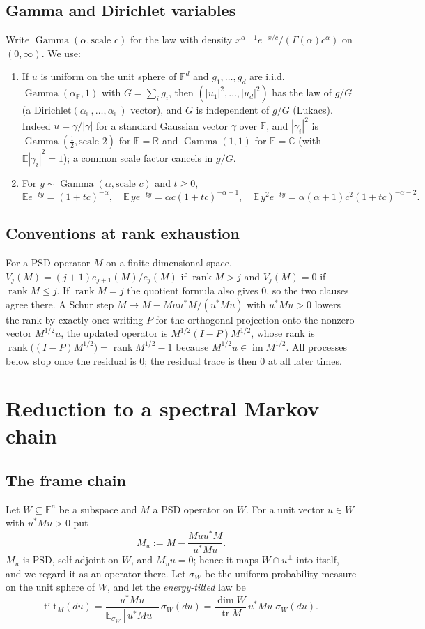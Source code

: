 \documentclass[11pt,a4paper]{article}
\theoremstyle{definition}
\newcommand{\E}{\mathbb{E}}
\newcommand{\R}{\mathbb{R}}
\newcommand{\C}{\mathbb{C}}
\newcommand{\F}{\mathbb{F}}
\newcommand{\tr}{\operatorname{tr}}
\newcommand{\rank}{\operatorname{rank}}
\newcommand{\Gam}{\operatorname{Gamma}}
\newcommand{\tilt}{\mathrm{tilt}}
\begin{document}
\subsection{Gamma and Dirichlet variables}
Write $\Gam(\alpha,\text{scale }c)$ for the law with density $x^{\alpha-1}e^{-x/c}/(\Gamma(\alpha)c^\alpha)$ on $(0,\infty)$. We use:
\begin{enumerate}
\item[(G1)] If $u$ is uniform on the unit sphere of $\F^d$ and $g_1,\dots,g_d$ are i.i.d.\ $\Gam(\alpha_\F,1)$ with $G=\sum_ig_i$, then $(|u_1|^2,\dots,|u_d|^2)$ has the law of $g/G$ (a $\mathrm{Dirichlet}(\alpha_\F,\dots,\alpha_\F)$ vector), and $G$ is independent of $g/G$ (Lukacs). Indeed $u=\gamma/|\gamma|$ for a standard Gaussian vector $\gamma$ over $\F$, and $|\gamma_i|^2$ is $\Gam(\frac12,\text{scale }2)$ for $\F=\R$ and $\Gam(1,1)$ for $\F=\C$ (with $\E|\gamma_i|^2=1$); a common scale factor cancels in $g/G$.
\item[(G2)] For $y\sim\Gam(\alpha,\text{scale }c)$ and $t\ge0$,
\[
\E e^{-ty}=(1+tc)^{-\alpha},\quad \E\,ye^{-ty}=\alpha c(1+tc)^{-\alpha-1},\quad \E\,y^2e^{-ty}=\alpha(\alpha+1)c^2(1+tc)^{-\alpha-2}.
\]
\end{enumerate}

\subsection{Conventions at rank exhaustion}\label{sec:conventions}
For a PSD operator $M$ on a finite-dimensional space, $V_j(M)=(j+1)e_{j+1}(M)/e_j(M)$ if $\rank M>j$ and $V_j(M)=0$ if $\rank M\le j$. If $\rank M=j$ the quotient formula also gives $0$, so the two clauses agree there. A Schur step $M\mapsto M-Muu^*M/(u^*Mu)$ with $u^*Mu>0$ lowers the rank by exactly one: writing $P$ for the orthogonal projection onto the nonzero vector $M^{1/2}u$, the updated operator is $M^{1/2}(I-P)M^{1/2}$, whose rank is $\rank\big((I-P)M^{1/2}\big)=\rank M^{1/2}-1$ because $M^{1/2}u\in\operatorname{im}M^{1/2}$. All processes below stop once the residual is $0$; the residual trace is then $0$ at all later times.
\section{Reduction to a spectral Markov chain}\label{sec:reduction}

\subsection{The frame chain}
Let $W\subseteq\F^n$ be a subspace and $M$ a PSD operator on $W$. For a unit vector $u\in W$ with $u^*Mu>0$ put
\[
M_u:=M-\frac{Muu^*M}{u^*Mu}.
\]
$M_u$ is PSD, self-adjoint on $W$, and $M_uu=0$; hence it maps $W\cap u^\perp$ into itself, and we regard it as an operator there. Let $\sigma_W$ be the uniform probability measure on the unit sphere of $W$, and let the \emph{energy-tilted} law be
\begin{equation}\label{eq:tilt}
\tilt_M(du)=\frac{u^*Mu}{\E_{\sigma_W}[u^*Mu]}\,\sigma_W(du)=\frac{\dim W}{\tr M}\,u^*Mu\;\sigma_W(du).
\end{equation}
\end{document}
